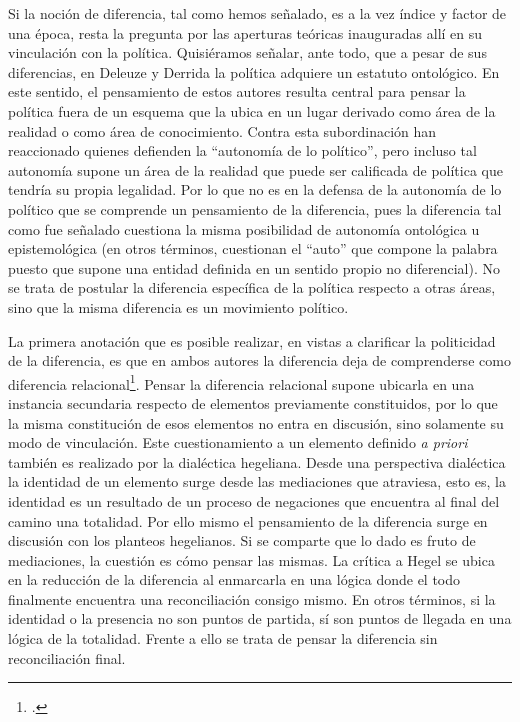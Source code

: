 Si la noción de diferencia, tal como hemos señalado, es a la vez índice y factor de una época, resta la pregunta por las aperturas teóricas inauguradas allí en su vinculación con la política. Quisiéramos señalar, ante todo, que a pesar de sus diferencias, en Deleuze y Derrida la política adquiere un estatuto ontológico. En este sentido, el pensamiento de estos autores resulta central para pensar la política fuera de un esquema que la ubica en un lugar derivado como área de la realidad o como área de conocimiento. Contra esta subordinación han reaccionado quienes defienden la \enquote{autonomía de lo político}, pero incluso tal autonomía supone un área de la realidad que puede ser calificada de política que tendría su propia legalidad. Por lo que no es en la defensa de la autonomía de lo político que se comprende un pensamiento de la diferencia, pues la diferencia tal como fue señalado cuestiona la misma posibilidad de autonomía ontológica u epistemológica (en otros términos, cuestionan el \enquote{auto} que compone la palabra puesto que supone una entidad definida en un sentido propio no diferencial). No se trata de postular la diferencia específica de la política respecto a otras áreas, sino que la misma diferencia es un movimiento político.

La primera anotación que es posible realizar, en vistas a clarificar la politicidad de la diferencia, es que en ambos autores la diferencia deja de comprenderse como diferencia relacional\footcite[En este sentido, la diferencia es también la relación con lo sin-relación, con el afuera: \enquote{Lo otro antes de ser mi otro, es decir, el opuesto o la negación de mí \emph{mismo,} es el \emph{afuera} que no deja de habitarme, de repetirme y alterarme al punto en que yo no tengo ya identidad alguna, de espaciarme, diferenciarme, divergirme, aun cuando en este espaciamiento yo no haya tenido nunca identidad ni egoidad alguna, no haya tenido jamás palabra}.][126]{@6985-MENGUE2008}. Pensar la diferencia relacional supone ubicarla en una instancia secundaria respecto de elementos previamente constituidos, por lo que la misma constitución de esos elementos no entra en discusión, sino solamente su modo de vinculación. Este cuestionamiento a un elemento definido \emph{a priori} también es realizado por la dialéctica hegeliana. Desde una perspectiva dialéctica la identidad de un elemento surge desde las mediaciones que atraviesa, esto es, la identidad es un resultado de un proceso de negaciones que encuentra al final del camino una totalidad. Por ello mismo el pensamiento de la diferencia surge en discusión con los planteos hegelianos. Si se comparte que lo dado es fruto de mediaciones, la cuestión es cómo pensar las mismas. La crítica a Hegel se ubica en la reducción de la diferencia al enmarcarla en una lógica donde el todo finalmente encuentra una reconciliación consigo mismo. En otros términos, si la identidad o la presencia no son puntos de partida, sí son puntos de llegada en una lógica de la totalidad. Frente a ello se trata de pensar la diferencia sin reconciliación final.

